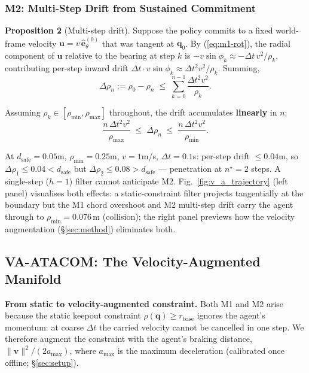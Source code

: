 \documentclass[letterpaper]{article}
\begin{document}
\subsubsection{M2: Multi-Step Drift from Sustained Commitment}

\textbf{Proposition 2} (Multi-step drift). Suppose the policy commits to a fixed world-frame velocity $\boldsymbol{u} = v\,\hat{\boldsymbol{e}}_\theta^{(0)}$ that was tangent at $\boldsymbol{q}_0$. By (\ref{eq:m1-rot}), the radial component of $\boldsymbol{u}$ relative to the bearing at step $k$ is $-v\sin\phi_k \approx -\Delta t\,v^2/\rho_k$, contributing per-step inward drift $\Delta t \cdot v\sin\phi_k \approx \Delta t^2 v^2/\rho_k$. Summing,
\begin{equation}
\Delta\rho_n := \rho_0 - \rho_n \;\le\; \sum_{k=0}^{n-1} \frac{\Delta t^2 v^2}{\rho_k}.
\label{eq:m2}
\end{equation}

Assuming $\rho_k \in [\rho_{\min}, \rho_{\max}]$ throughout, the drift accumulates \textbf{linearly} in $n$:
\begin{equation}
\frac{n\,\Delta t^2 v^2}{\rho_{\max}} \;\le\; \Delta\rho_n \;\le\; \frac{n\,\Delta t^2 v^2}{\rho_{\min}}.
\end{equation}

At $d_\text{safe} = 0.05$m, $\rho_{\min} = 0.25$m, $v = 1$m/s, $\Delta t = 0.1$s: per-step drift $\le 0.04$m, so $\Delta\rho_1 \le 0.04 < d_\text{safe}$ but $\Delta\rho_2 \le 0.08 > d_\text{safe}$ — penetration at $n^\star = 2$ steps. A single-step ($h{=}1$) filter cannot anticipate M2. Fig.~\ref{fig:v_a_trajectory} (left panel) visualises both effects: a static-constraint filter projects tangentially at the boundary but the M1 chord overshoot and M2 multi-step drift carry the agent through to $\rho_{\min}{=}0.076$\,m (collision); the right panel previews how the velocity augmentation (\S\ref{sec:method}) eliminates both.

\subsection{VA-ATACOM: The Velocity-Augmented Manifold}
\label{sec:design}

\textbf{From static to velocity-augmented constraint.} Both M1 and M2 arise because the static keepout constraint $\rho(\boldsymbol{q}) \ge r_\text{base}$ ignores the agent's momentum: at coarse $\Delta t$ the carried velocity cannot be cancelled in one step. We therefore augment the constraint with the agent's braking distance, $\|\boldsymbol{v}\|^2/(2a_{\max})$, where $a_{\max}$ is the maximum deceleration (calibrated once offline; \S\ref{sec:setup}).
\end{document}
